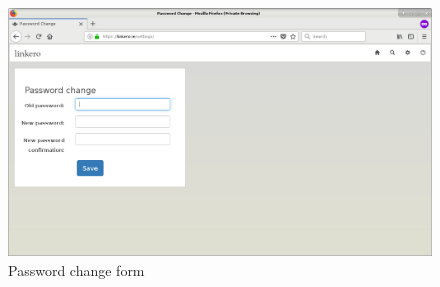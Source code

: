 \begin{figure}[H]
\centering
\includegraphics[scale=0.3]{imgs/PasswdChange.png}
\caption{Password change form}
\label{fig:pwdform}
\end{figure}


